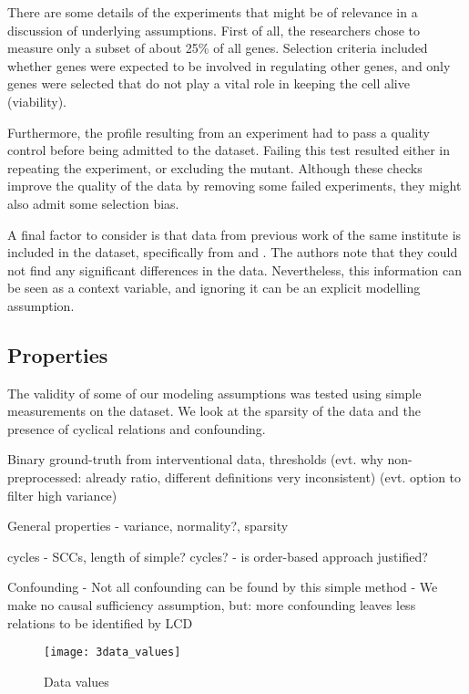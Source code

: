 There are some details of the experiments that might be of relevance in a discussion of underlying assumptions. First of all, the researchers chose to measure only a subset of about 25\% of all genes. Selection criteria included whether genes were expected to be involved in regulating other genes, and only genes were selected that do not play a vital role in keeping the cell alive (viability).

Furthermore, the profile resulting from an experiment had to pass a quality control before being admitted to the dataset. Failing this test resulted either in repeating the experiment, or excluding the mutant. Although these checks improve the quality of the data by removing some failed experiments, they might also admit some selection bias.

A final factor to consider is that  data from previous work of the same institute is included in the dataset, specifically from \citet{lenstra2011specificity} and \citet{van2010functional}. The authors note that they could not find any significant differences in the data. Nevertheless, this information can be seen as a context variable, and ignoring it can be an explicit modelling assumption.


\subsection{Properties}
The validity of some of our modeling assumptions was tested using simple measurements on the dataset. We look at the sparsity of the data and the presence of cyclical relations and confounding. 

Binary ground-truth from interventional data, thresholds 
(evt. why non-preprocessed: already ratio, different definitions very inconsistent)
(evt. option to filter high variance)

General properties
- variance, normality?, sparsity

cycles
- SCCs, length of simple? cycles?
- is order-based approach justified?

Confounding
- Not all confounding can be found by this simple method
- We make no causal sufficiency assumption, but: more confounding leaves less relations to be identified by LCD


\begin{figure}[h]
    \centering
    \texttt{[image: 3data\_values]}
    \caption{Data values}
    \label{fig:3:datavalues}
\end{figure}